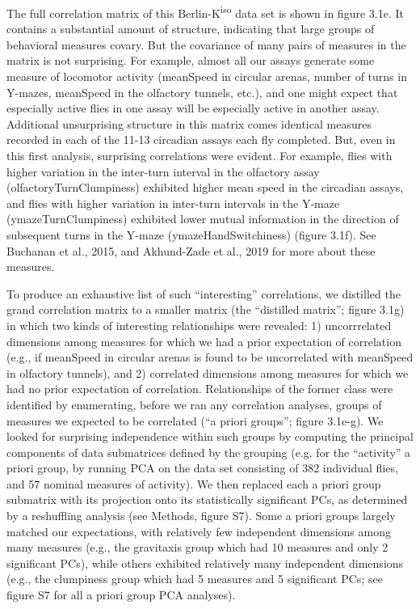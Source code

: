 \documentclass[12pt,letterpaper]{article}
\begin{document}
The full correlation matrix of this Berlin-K\textsuperscript{iso} data set is shown in figure 3.1e. It contains a substantial amount of structure, indicating that large groups of behavioral measures covary. But the covariance of many pairs of measures in the matrix is not surprising. For example, almost all our assays generate some measure of locomotor activity (meanSpeed in circular arenas, number of turns in Y-mazes, meanSpeed in the olfactory tunnels, etc.), and one might expect that especially active flies in one assay will be especially active in another assay. Additional unsurprising structure in this matrix comes identical measures recorded in each of the 11-13 circadian assays each fly completed. But, even in this first analysis, surprising correlations were evident. For example, flies with higher variation in the inter-turn interval in the olfactory assay (olfactoryTurnClumpiness) exhibited higher mean speed in the circadian assays, and flies with higher variation in inter-turn intervals in the Y-maze (ymazeTurnClumpiness) exhibited lower mutual information in the direction of subsequent turns in the Y-maze (ymazeHandSwitchiness) (figure 3.1f). See Buchanan et al., 2015, and Akhund-Zade et al., 2019 for more about these measures. 

To produce an exhaustive list of such “interesting” correlations, we distilled the grand correlation matrix to a smaller matrix (the “distilled matrix”; figure 3.1g) in which two kinds of interesting relationships were revealed: 1) uncorrrelated dimensions among measures for which we had a prior expectation of correlation (e.g., if meanSpeed in circular arenas is found to be uncorrelated with meanSpeed in olfactory tunnels), and 2) correlated dimensions among measures for which we had no prior expectation of correlation. Relationships of the former class were identified by enumerating, before we ran any correlation analyses, groups of measures we expected to be correlated (“a priori groups”; figure 3.1e-g). We looked for surprising independence within such groups by computing the principal components of data submatrices defined by the grouping (e.g. for the “activity” a priori group, by running PCA on the data set consisting of 382 individual flies, and 57 nominal measures of activity). We then replaced each a priori group submatrix with its projection onto its statistically significant PCs, as determined by a reshuffling analysis (see Methods, figure S7). Some a priori groups largely matched our expectations, with relatively few independent dimensions among many measures (e.g., the gravitaxis group which had 10 measures and only 2 significant PCs), while others exhibited relatively many independent dimensions (e.g., the clumpiness group which had 5 measures and 5 significant PCs; see figure S7 for all a priori group PCA analyses). 
\end{document}
